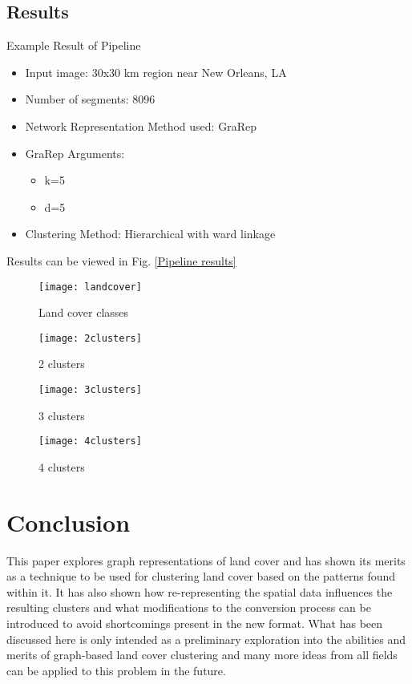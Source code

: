 \documentclass[conference]{IEEEtran}
\begin{document}
	\subsection {Results}
	Example Result of Pipeline
	\begin{itemize}
		\item Input image: 30x30 km region near New Orleans, LA
		\item Number of segments: 8096
		\item Network Representation Method used: GraRep
		\item GraRep Arguments:
		\begin{itemize}
			\item k=5
			\item d=5
		\end{itemize}
		\item Clustering Method: Hierarchical with ward linkage
		
	\end{itemize}
	Results can be viewed in Fig. \ref{Pipeline results}
	\begin{figure*}[t!]
		\centering
		\begin{subfigure}[b]{0.4\textwidth}
			\centering
			\texttt{[image: landcover]}
			\caption{Land cover classes}
			\label{base}
		\end{subfigure}
		\hfill
		\begin{subfigure}[b]{0.4\textwidth}
			\centering
			\texttt{[image: 2clusters]}
			\caption{2 clusters}
			\label{2 clusters}
		\end{subfigure}
		\hfill
		\begin{subfigure}[b]{0.4\textwidth}
			\centering
			\texttt{[image: 3clusters]}
			\caption{3 clusters}
			\label{3 clusters}
		\end{subfigure}
		\hfill
		\begin{subfigure}[b]{0.4\textwidth}
			\centering
			\texttt{[image: 4clusters]}
			\caption{4 clusters}
			\label{4 clusters}
		\end{subfigure}
		\caption{Pipeline results}
		\label{Pipeline results}
	\end{figure*}
	
	
	
	\section{Conclusion}
	This paper explores graph representations of land cover and has shown its merits as a technique to be used for clustering land cover based on the patterns found within it. It has also shown how re-representing the spatial data influences the resulting clusters and what modifications to the conversion process can be introduced to avoid shortcomings present in the new format. What has been discussed here is only intended as a preliminary exploration into the abilities and merits of graph-based land cover clustering and many more ideas from all fields can be applied to this problem in the future.
	
	
	
	
	
	
	
\end{document}
